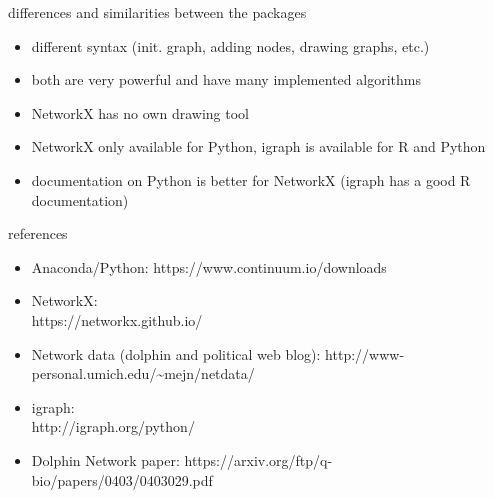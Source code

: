 \documentclass[12pt]{beamer}
\begin{document}
	\begin{frame}{differences and similarities between the packages}
		\begin{itemize}
			\item different syntax (init. graph, adding nodes, drawing graphs, etc.)
			\item both are very powerful and have many implemented algorithms
			\item NetworkX has no own drawing tool 
			\item NetworkX only available for Python, igraph is available for R and Python
			\item documentation on Python is better for NetworkX (igraph has a good R documentation)
		\end{itemize}
	\end{frame}
	\begin{frame}{references}
		\begin{itemize}
			\item Anaconda/Python: https://www.continuum.io/downloads
			\item NetworkX: \\https://networkx.github.io/
			\item Network data (dolphin and political web blog): http://www-personal.umich.edu/\textasciitilde mejn/netdata/
			\item igraph: \\
			http://igraph.org/python/
			\item Dolphin Network paper: https://arxiv.org/ftp/q-bio/papers/0403/0403029.pdf			
		\end{itemize}
	\end{frame}
\end{document}
